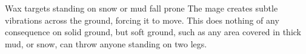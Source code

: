   {\mAir}%
  {Wax}%
  {}%
  {}%
  {targets standing on snow or mud fall prone}%
  {
    The mage creates subtle vibrations across the ground, forcing it to move.
    This does nothing of any consequence on solid ground, but soft ground, such as any area covered in thick mud, or snow, can throw anyone standing on two legs.
  }

